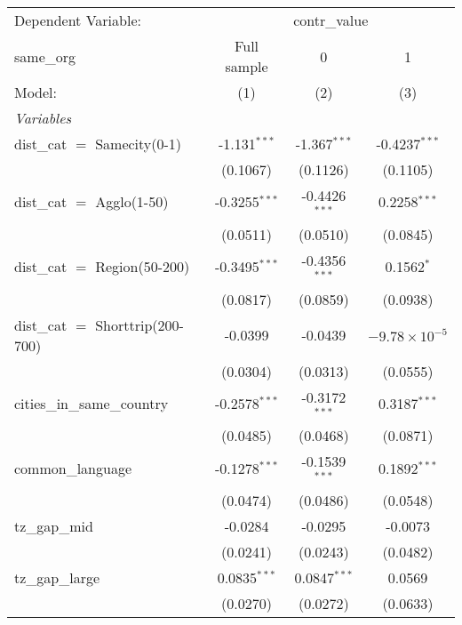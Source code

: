 
\begingroup
\centering
\begin{tabular}{lccc}
   \tabularnewline \midrule \midrule
   Dependent Variable: & \multicolumn{3}{c}{contr\_value}\\
   same\_org                         & Full sample     & 0               & 1 \\   
   Model:                            & (1)             & (2)             & (3)\\  
   \midrule
   \emph{Variables}\\
   dist\_cat $=$ Samecity(0-1)       & -1.131$^{***}$  & -1.367$^{***}$  & -0.4237$^{***}$\\   
                                     & (0.1067)        & (0.1126)        & (0.1105)\\   
   dist\_cat $=$ Agglo(1-50)         & -0.3255$^{***}$ & -0.4426$^{***}$ & 0.2258$^{***}$\\   
                                     & (0.0511)        & (0.0510)        & (0.0845)\\   
   dist\_cat $=$ Region(50-200)      & -0.3495$^{***}$ & -0.4356$^{***}$ & 0.1562$^{*}$\\   
                                     & (0.0817)        & (0.0859)        & (0.0938)\\   
   dist\_cat $=$ Shorttrip(200-700)  & -0.0399         & -0.0439         & $-9.78\times 10^{-5}$\\    
                                     & (0.0304)        & (0.0313)        & (0.0555)\\   
   cities\_in\_same\_country         & -0.2578$^{***}$ & -0.3172$^{***}$ & 0.3187$^{***}$\\   
                                     & (0.0485)        & (0.0468)        & (0.0871)\\   
   common\_language                  & -0.1278$^{***}$ & -0.1539$^{***}$ & 0.1892$^{***}$\\   
                                     & (0.0474)        & (0.0486)        & (0.0548)\\   
   tz\_gap\_mid                      & -0.0284         & -0.0295         & -0.0073\\   
                                     & (0.0241)        & (0.0243)        & (0.0482)\\   
   tz\_gap\_large                    & 0.0835$^{***}$  & 0.0847$^{***}$  & 0.0569\\   
                                     & (0.0270)        & (0.0272)        & (0.0633)\\   

\end{tabular}
